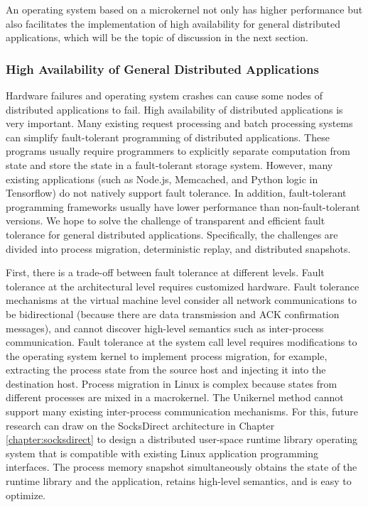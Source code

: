 An operating system based on a microkernel not only has higher performance but also facilitates the implementation of high availability for general distributed applications, which will be the topic of discussion in the next section.

\subsubsection{High Availability of General Distributed Applications}
\label{future:ftlinux}

Hardware failures and operating system crashes can cause some nodes of distributed applications to fail.
High availability of distributed applications is very important.
Many existing request processing and batch processing systems can simplify fault-tolerant programming of distributed applications.
These programs usually require programmers to explicitly separate computation from state and store the state in a fault-tolerant storage system.
However, many existing applications (such as Node.js, Memcached, and Python logic in Tensorflow) do not natively support fault tolerance. In addition, fault-tolerant programming frameworks usually have lower performance than non-fault-tolerant versions.
We hope to solve the challenge of transparent and efficient fault tolerance for general distributed applications.
Specifically, the challenges are divided into process migration, deterministic replay, and distributed snapshots.

First, there is a trade-off between fault tolerance at different levels.
Fault tolerance at the architectural level requires customized hardware.
Fault tolerance mechanisms at the virtual machine level consider all network communications to be bidirectional (because there are data transmission and ACK confirmation messages), and cannot discover high-level semantics such as inter-process communication.
Fault tolerance at the system call level requires modifications to the operating system kernel to implement process migration, for example, extracting the process state from the source host and injecting it into the destination host.
Process migration in Linux is complex because states from different processes are mixed in a macrokernel.
The Unikernel method cannot support many existing inter-process communication mechanisms.
For this, future research can draw on the SocksDirect architecture in Chapter \ref{chapter:socksdirect} to design a distributed user-space runtime library operating system that is compatible with existing Linux application programming interfaces.
The process memory snapshot simultaneously obtains the state of the runtime library and the application, retains high-level semantics, and is easy to optimize.

